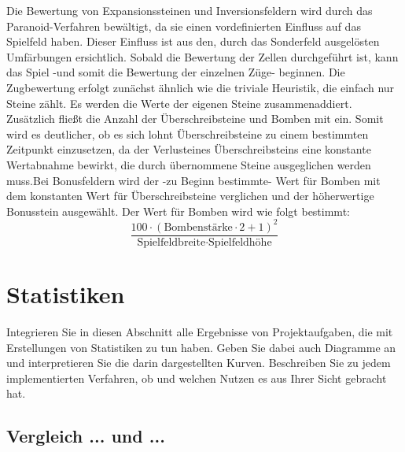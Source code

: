 \documentclass[12pt,a4paper]{article}
\begin{document}
Die Bewertung von Expansionssteinen und Inversionsfeldern wird durch das Paranoid-Verfahren bewältigt, da sie einen vordefinierten Einfluss auf das Spielfeld haben. Dieser Einfluss ist aus den, durch das Sonderfeld ausgelösten Umfärbungen ersichtlich.
\newpage
Sobald die Bewertung der Zellen durchgeführt ist, kann das Spiel -und somit die Bewertung der einzelnen Züge- beginnen. Die Zugbewertung erfolgt zunächst ähnlich wie die triviale Heuristik, die einfach nur Steine zählt. Es werden die Werte der eigenen Steine zusammenaddiert. Zusätzlich fließt die Anzahl der Überschreibsteine und Bomben mit ein. Somit wird es deutlicher, ob es sich lohnt Überschreibsteine zu einem bestimmten Zeitpunkt einzusetzen, da der \glqq Verlust\grqq eines Überschreibsteins eine konstante Wertabnahme bewirkt, die durch übernommene Steine ausgeglichen werden muss.\newline Bei Bonusfeldern wird der -zu Beginn bestimmte- Wert für Bomben mit dem konstanten Wert für Überschreibsteine verglichen und der höherwertige Bonusstein ausgewählt. Der Wert für Bomben wird wie folgt bestimmt:\newline
\begin{equation*}
	\frac{100 \cdot (\text{Bombenstärke} \cdot 2 + 1)^2}{\text{Spielfeldbreite} \cdot \text{Spielfeldhöhe}}
\end{equation*}
\newline
\newpage
\section{Statistiken}
Integrieren Sie in diesen Abschnitt alle Ergebnisse von Projektaufgaben, die mit Erstellungen von Statistiken zu tun haben. Geben Sie dabei auch Diagramme an und interpretieren Sie die darin dargestellten Kurven. Beschreiben Sie zu jedem implementierten Verfahren, ob und welchen Nutzen es aus Ihrer Sicht gebracht hat.

\subsection{Vergleich ... und ...}
\end{document}
